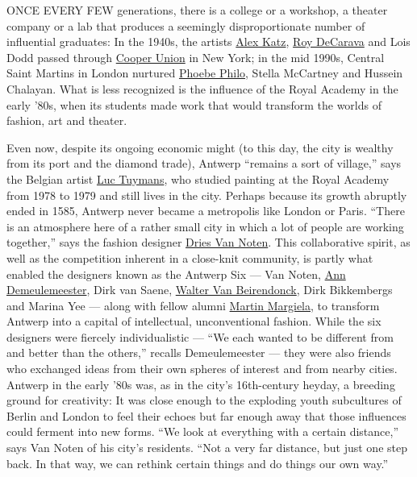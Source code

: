 ONCE EVERY FEW generations, there is a college or a workshop, a theater
company or a lab that produces a seemingly disproportionate number of
influential graduates: In the 1940s, the artists
\href{https://www.nytimes.com/topic/person/alex-katz}{Alex Katz},
\href{https://www.nytimes.com/topic/person/roy-decarava}{Roy DeCarava}
and Lois Dodd passed through
\href{https://www.nytimes.com/topic/organization/cooper-union-for-the-advancement-of-science-and-art}{Cooper
Union} in New York; in the mid 1990s, Central Saint Martins in London
nurtured
\href{https://www.nytimes.com/2014/02/14/t-magazine/phoebe-philo-celine-prophetic-fashion.html}{Phoebe
Philo}, Stella McCartney and Hussein Chalayan. What is less recognized
is the influence of the Royal Academy in the early '80s, when its
students made work that would transform the worlds of fashion, art and
theater.

Even now, despite its ongoing economic might (to this day, the city is
wealthy from its port and the diamond trade), Antwerp ``remains a sort
of village,'' says the Belgian artist
\href{https://www.nytimes.com/2019/03/21/arts/design/luc-tuymans-palazzo-grassi-mosaic-la-pelle.html}{Luc
Tuymans}, who studied painting at the Royal Academy from 1978 to 1979
and still lives in the city. Perhaps because its growth abruptly ended
in 1585, Antwerp never became a metropolis like London or Paris. ``There
is an atmosphere here of a rather small city in which a lot of people
are working together,'' says the fashion designer
\href{https://www.nytimes.com/2017/10/16/t-magazine/dries-van-noten.html}{Dries
Van Noten}. This collaborative spirit, as well as the competition
inherent in a close-knit community, is partly what enabled the designers
known as the Antwerp Six --- Van Noten,
\href{https://www.nytimes.com/2006/08/27/style/tmagazine/27ann.html}{Ann
Demeulemeester}, Dirk van Saene,
\href{https://www.nytimes.com/2019/09/03/t-magazine/walter-van-beirendonck.html}{Walter
Van Beirendonck}, Dirk Bikkembergs and Marina Yee --- along with fellow
alumni
\href{https://www.nytimes.com/2018/03/08/t-magazine/fashion/martin-margiela-history-fall-winter-2000-show.html}{Martin
Margiela}, to transform Antwerp into a capital of intellectual,
unconventional fashion. While the six designers were fiercely
individualistic --- ``We each wanted to be different from and better
than the others,'' recalls Demeulemeester --- they were also friends who
exchanged ideas from their own spheres of interest and from nearby
cities. Antwerp in the early '80s was, as in the city's 16th-century
heyday, a breeding ground for creativity: It was close enough to the
exploding youth subcultures of Berlin and London to feel their echoes
but far enough away that those influences could ferment into new forms.
``We look at everything with a certain distance,'' says Van Noten of his
city's residents. ``Not a very far distance, but just one step back. In
that way, we can rethink certain things and do things our own way.''


